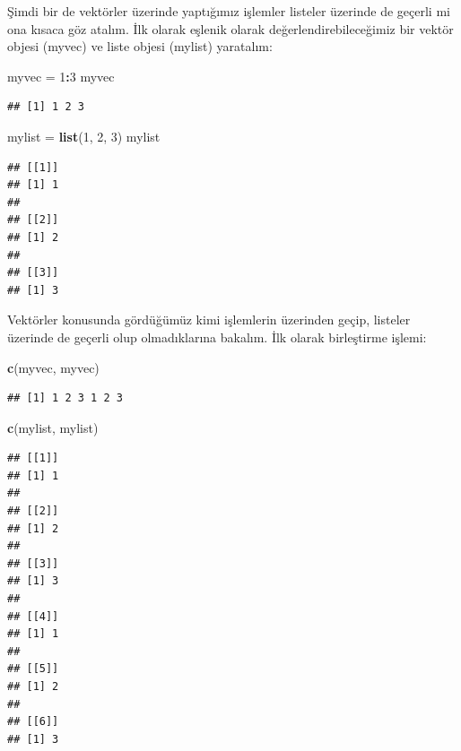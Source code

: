 \documentclass[
]{book}
\newenvironment{Shaded}{\begin{snugshade}}{\end{snugshade}}
\newcommand{\DecValTok}[1]{\textcolor[rgb]{0.00,0.00,0.81}{#1}}
\newcommand{\KeywordTok}[1]{\textcolor[rgb]{0.13,0.29,0.53}{\textbf{#1}}}
\newcommand{\NormalTok}[1]{#1}
\newcommand{\OperatorTok}[1]{\textcolor[rgb]{0.81,0.36,0.00}{\textbf{#1}}}
\newcommand{\StringTok}[1]{\textcolor[rgb]{0.31,0.60,0.02}{#1}}
\begin{document}
Şimdi bir de vektörler üzerinde yaptığımız işlemler listeler üzerinde de geçerli mi ona kısaca göz atalım. İlk olarak eşlenik olarak değerlendirebileceğimiz bir vektör objesi (myvec) ve liste objesi (mylist) yaratalım:

\begin{Shaded}
\begin{Highlighting}[]
\NormalTok{myvec =}\StringTok{ }\DecValTok{1}\OperatorTok{:}\DecValTok{3}
\NormalTok{myvec}
\end{Highlighting}
\end{Shaded}

\begin{verbatim}
## [1] 1 2 3
\end{verbatim}

\begin{Shaded}
\begin{Highlighting}[]
\NormalTok{mylist =}\StringTok{ }\KeywordTok{list}\NormalTok{(}\DecValTok{1}\NormalTok{, }\DecValTok{2}\NormalTok{, }\DecValTok{3}\NormalTok{)}
\NormalTok{mylist}
\end{Highlighting}
\end{Shaded}

\begin{verbatim}
## [[1]]
## [1] 1
## 
## [[2]]
## [1] 2
## 
## [[3]]
## [1] 3
\end{verbatim}

Vektörler konusunda gördüğümüz kimi işlemlerin üzerinden geçip, listeler üzerinde de geçerli olup olmadıklarına bakalım. İlk olarak birleştirme işlemi:

\begin{Shaded}
\begin{Highlighting}[]
\KeywordTok{c}\NormalTok{(myvec, myvec)}
\end{Highlighting}
\end{Shaded}

\begin{verbatim}
## [1] 1 2 3 1 2 3
\end{verbatim}

\begin{Shaded}
\begin{Highlighting}[]
\KeywordTok{c}\NormalTok{(mylist, mylist)}
\end{Highlighting}
\end{Shaded}

\begin{verbatim}
## [[1]]
## [1] 1
## 
## [[2]]
## [1] 2
## 
## [[3]]
## [1] 3
## 
## [[4]]
## [1] 1
## 
## [[5]]
## [1] 2
## 
## [[6]]
## [1] 3
\end{verbatim}
\end{document}
